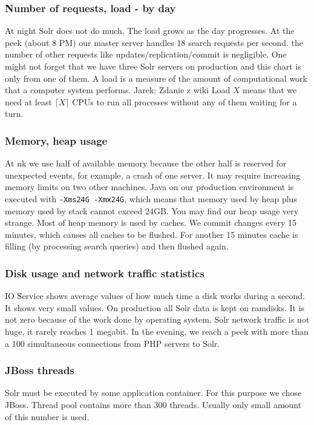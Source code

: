 \documentclass[10pt,a4paper]{article}
\newcommand{\jarek}[1]{\noindent\colorbox{myYellow}{Jarek: #1}}
\begin{document}
\subsubsection*{Number of requests, load - by day} 
At night Solr does not do much. The load grows as the day progresses. At the peek (about 8 PM) our master server handles 18 search requests per second. the number of other requests like updates/replication/commit is negligible. One might not forget that we have three Solr servers on production and this chart is only from one of them. A load is a measure of the amount of computational work that a computer system performs. \jarek{Zdanie z wiki} Load $X$ means that we need at least $\lceil X \rceil$ CPUs to run all processes without any of them waiting for a turn. 

\subsubsection*{Memory, heap usage}
At nk we use half of available memory because the other half is reserved for unexpected events, for example, a crash of one server. It may require increasing memory limits on two other machines. Java on our production environment is executed with \verb|-Xms24G -Xmx24G|, which means that memory used by heap plus memory used by stack cannot exceed 24GB. You may find our heap usage very strange. Most of heap memory is used by caches. We commit changes every 15 minutes, which causes all caches to be flushed. For another 15 minutes cache is filling (by processing search queries) and then flushed again.

\subsubsection*{Disk usage and network traffic statistics}
IO Service shows average values of how much time a disk works during a second. It shows very small values. On production all Solr data is kept on ramdisks. It is not zero because of the work done by operating system. Solr network traffic is not huge, it rarely reaches 1 megabit. In the evening, we reach a peek with more than a 100 simultaneous connections from PHP servers to Solr.


\subsubsection*{JBoss threads}
Solr must be executed by some application container. For this purpose we chose JBoss. Thread pool contains more than 300 threads. Usually only small amount of this number is used.
\end{document}
